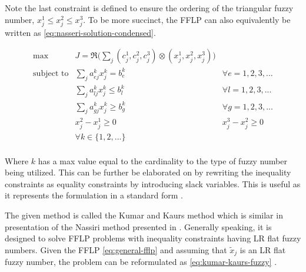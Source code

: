 \documentclass[11pt,a4paper,final]{article}
\begin{document}
\noindent Note the last constraint is defined to ensure the ordering of the triangular fuzzy number, \(x_j^1 \le x_j^2 \le x_j^3\).
To be more succinct, the FFLP can also equivalently be written as \ref{eq:nasseri-solution-condensed}.

\begin{equation}
\label{eq:nasseri-solution-condensed}
\begin{array}{llc}
\text{max}   & J = \mathfrak{R}\Big(\sum_j (c_j^1,c_j^2,c_j^3) \otimes (x_j^1,x_j^2,x_j^3)\Big) &\\
\text{subject to} & \sum_j a_{ej}^k x_j^k = b_e^k &  \forall e = 1,2,3,... \\
                  & \sum_j a_{lj}^k x_j^k \le b_l^k &  \forall l = 1,2,3,... \\
                  & \sum_j a_{gj}^k x_j^k \ge b_g^k  &  \forall g = 1,2,3,... \\
                  & x_j^2 - x_j^1 \ge 0         & x_j^3 - x_j^2 \ge 0 \\
                  & \forall k \in \{1,2,...\}        &                  \\
\end{array}
\end{equation}

Where \(k\) has a max value equal to the cardinality to the type of fuzzy number being utilized. This can be further be
elaborated on by rewriting the inequality constraints as equality constraints by introducing slack variables. This is
useful as it represents the formulation in a standard form \cite{chen-2010-applied,vanderbei-2020-linear-progr}.

The given method is called the Kumar and Kaurs method \cite{kaur-2016-introd-fuzzy} which is similar in presentation of
the Nassiri method presented in \cite{bello-2019-fuzzy-activ}. Generally speaking, it is designed to solve FFLP
problems with inequality constraints having LR flat fuzzy numbers. Given the FFLP \ref{eq:general-fflp} and assuming that
\(\tilde{x}_j\) is an LR flat fuzzy number, the problem can be reformulated as \ref{eq:kumar-kaurs-fuzzy}
\cite{kaur-2016-introd-fuzzy}.
\end{document}
